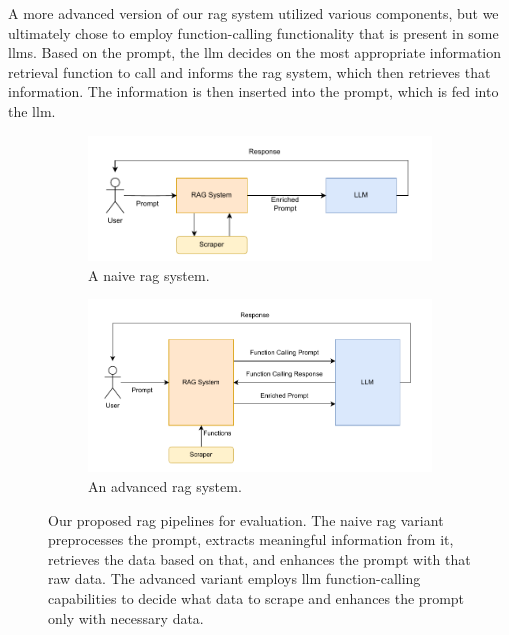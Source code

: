 \documentclass[fleqn,moreauthors,10pt]{ds_report}
\begin{document}
A more advanced version of our \ac{rag} system utilized various components, but we ultimately chose to employ function-calling functionality that is present in some \acp{llm}. Based on the prompt, the \ac{llm} decides on the most appropriate information retrieval function to call and informs the \ac{rag} system, which then retrieves that information. The information is then inserted into the prompt, which is fed into the \ac{llm}.

\begin{figure}
	\centering
	\begin{subfigure}{0.4\textwidth}
		\includegraphics[width=\textwidth]{./figures/simple_rag.pdf}
		\caption{A naive \ac{rag} system.}
	\end{subfigure}
	\hspace{20pt}
	\begin{subfigure}{0.4\textwidth}
		\includegraphics[width=\linewidth]{./figures/advanced_rag.pdf}
		\caption{An advanced \ac{rag} system.}
	\end{subfigure}
	\caption{Our proposed \ac{rag} pipelines for evaluation. The naive \ac{rag} variant preprocesses the prompt, extracts meaningful information from it, retrieves the data based on that, and enhances the prompt with that raw data. The advanced variant employs \ac{llm} function-calling capabilities to decide what data to scrape and enhances the prompt only with necessary data.}
	\label{fig:pipeline}
\end{figure}
\end{document}
